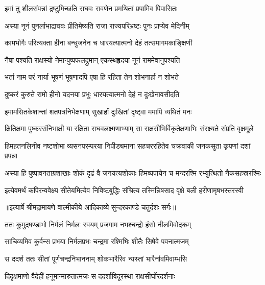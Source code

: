 \twolineshloka
{इमां तु शीलसंपन्नां द्रष्टुमिच्छति राघवः}
{रावणेन प्रमथितां प्रपामिव पिपासितः} %

\twolineshloka
{अस्या नूनं पुनर्लाभाद्राघवः प्रीतिमेष्यति}
{राजा राज्यपरिभ्रष्टः पुनः प्राप्येव मेदिनीम्} %

\twolineshloka
{कामभोगैः परित्यक्ता हीना बन्धुजनेन च}
{धारयत्यात्मनो देहं तत्समागमकाङ्क्षिणी} %

\twolineshloka
{नैषा पश्यति राक्षस्यो नेमान्पुष्पफलद्रुमान्}
{एकस्थहृदया नूनं राममेवानुपश्यति} %

\twolineshloka
{भर्ता नाम परं नार्या भूषणं भूषणादपि}
{एषा हि रहिता तेन शोभनार्हा न शोभते} %

\twolineshloka
{दुष्करं कुरुते रामो हीनो यदनया प्रभुः}
{धारयत्यात्मनो देहं न दुःखेनावसीदति} %

\twolineshloka
{इमामसितकेशान्तां शतपत्रनिभेक्षणाम्}
{सुखार्हां दुःखितां दृष्ट्वा ममापि व्यथितं मनः} %

\fourlineindentedshloka
{क्षितिक्षमा पुष्करसंनिभाक्षी}
{ या रक्षिता राघवलक्ष्मणाभ्याम्}
{सा राक्षसीभिर्विकृतेक्षणाभिः}
{ संरक्ष्यते संप्रति वृक्षमूले} %

\fourlineindentedshloka
{हिमहतनलिनीव नष्टशोभा}
{ व्यसनपरम्परया निपीड्यमाना}
{सहचररहितेव चक्रवाकी}
{ जनकसुता कृपणां दशां प्रपन्ना} %

\fourlineindentedshloka
{अस्या हि पुष्पावनताग्रशाखाः}
{ शोकं दृढं वै जनयत्यशोकाः}
{हिमव्यपायेन च मन्दरश्मि}
{रभ्युत्थितो नैकसहस्ररश्मिः} %

\fourlineindentedshloka
{इत्येवमर्थं कपिरन्ववेक्ष्य}
{ सीतेयमित्येव निविष्टबुद्धिः}
{संश्रित्य तस्मिन्निषसाद वृक्षे}
{ बली हरीणामृषभस्तरस्वी} %


{॥इत्यार्षे श्रीमद्रामायणे वाल्मीकीये आदिकाव्ये सुन्दरकाण्डे चतुर्दशः सर्गः॥}


\twolineshloka
{ततः कुमुदषण्डाभो निर्मलं निर्मलः स्वयम्}
{प्रजगाम नभश्चन्द्रो हंसो नीलमिवोदकम्} %

\twolineshloka
{साचिव्यमिव कुर्वन्स प्रभया निर्मलप्रभः}
{चन्द्रमा रश्मिभिः शीतैः सिषेवे पवनात्मजम्} %

\twolineshloka
{स ददर्श ततः सीतां पूर्णचन्द्रनिभाननाम्}
{शोकभारैरिव न्यस्तां भारैर्नावमिवाम्भसि} %

\twolineshloka
{दिदृक्षमाणो वैदेहीं हनूमान्मारुतात्मजः}
{स ददर्शाविदूरस्था राक्षसीर्घोरदर्शनाः} %

